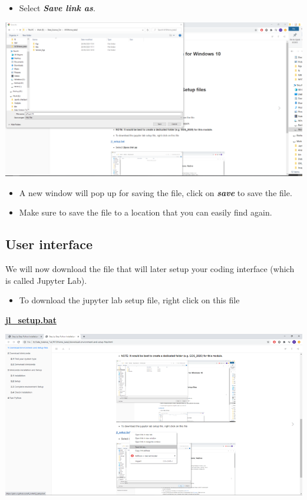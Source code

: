 \documentclass[
]{book}
\providecommand{\tightlist}{%
  \setlength{\itemsep}{0pt}\setlength{\parskip}{0pt}}
\begin{document}
\begin{itemize}
\tightlist
\item
  Select \textbf{\emph{Save link as}}.
\end{itemize}

\begin{center}\includegraphics[width=27.96in]{figs/chp4/Picture5} \end{center}

\begin{itemize}
\tightlist
\item
  A new window will pop up for saving the file, click on \textbf{\emph{save}} to save the file.
\item
  Make sure to save the file to a location that you can easily find again.
\end{itemize}

\hypertarget{user-interface}{%
\subsection*{User interface}\label{user-interface}}

We will now download the file that will later setup your coding interface (which is called Jupyter Lab).

\begin{itemize}
\tightlist
\item
  To download the jupyter lab setup file, right click on this file
\end{itemize}

\href{https://gdsl-ul.github.io/soft_install/jl_setup.bat}{\textbf{jl\_setup.bat}}

\begin{center}\includegraphics[width=11.24in]{figs/chp4/Picture6} \end{center}
\end{document}
